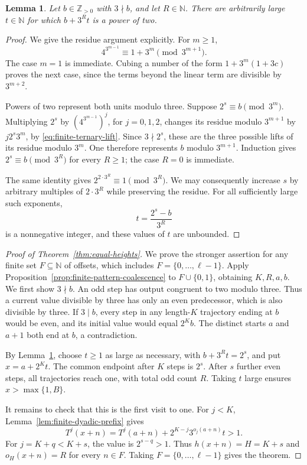 \documentclass[11pt,a4paper]{article}
\newtheorem{lemma}[theorem]{Lemma}
\begin{document}
\begin{lemma}\label{lem:finite-power-two-residue}
Let $b\in\mathbb Z_{>0}$ with $3\nmid b$, and let $R\in\mathbb N$.
There are arbitrarily large $t\in\mathbb N$ for which
$b+3^Rt$ is a power of two.
\end{lemma}
\begin{proof}
We give the residue argument explicitly. For $m\ge1$,
\begin{equation}\label{eq:finite-ternary-lift}
4^{3^{m-1}}\equiv1+3^m\pmod{3^{m+1}}.
\end{equation}
The case $m=1$ is immediate. Cubing a number of the form
$1+3^m(1+3c)$ proves the next case, since the terms beyond the
linear term are divisible by $3^{m+2}$.

Powers of two represent both units modulo three. Suppose
$2^s\equiv b\pmod{3^m}$. Multiplying $2^s$ by
$(4^{3^{m-1}})^j$, for $j=0,1,2$, changes its residue modulo
$3^{m+1}$ by $j2^s3^m$, by \eqref{eq:finite-ternary-lift}.
Since $3\nmid2^s$, these are the three possible lifts of its
residue modulo $3^m$. One therefore represents $b$ modulo
$3^{m+1}$. Induction gives $2^s\equiv b\pmod{3^R}$
for every $R\ge1$; the case $R=0$ is immediate.

The same identity gives
$2^{2\cdot3^R}\equiv1\pmod{3^R}$.
We may consequently increase $s$ by arbitrary multiples of
$2\cdot3^R$ while preserving the residue. For all sufficiently
large such exponents,
\[
t=\frac{2^s-b}{3^R}
\]
is a nonnegative integer, and these values of $t$ are unbounded.
\end{proof}

\begin{proof}[Proof of Theorem~\ref{thm:equal-heights}]
We prove the stronger assertion for any finite set $F\subseteq\mathbb N$
of offsets, which includes $F=\{0,\ldots,\ell-1\}$.
Apply Proposition~\ref{prop:finite-pattern-coalescence} to
$F\cup\{0,1\}$, obtaining $K,R,a,b$.
We first show $3\nmid b$. An odd step has output congruent
to two modulo three. Thus a current value divisible by three has
only an even predecessor, which is also divisible by three.
If $3\mid b$, every step in any length-$K$ trajectory ending
at $b$ would be even, and its initial value would equal $2^Kb$.
The distinct starts $a$ and $a+1$ both end at $b$, a
contradiction.

By Lemma~\ref{lem:finite-power-two-residue}, choose $t\ge1$
as large as necessary, with $b+3^Rt=2^s$, and put
$x=a+2^Kt$. The common endpoint after $K$ steps is $2^s$.
After $s$ further even steps, all trajectories reach one, with
total odd count $R$. Taking $t$ large ensures
$x>\max\{1,B\}$.

It remains to check that this is the first visit to one.
For $j<K$, Lemma~\ref{lem:finite-dyadic-prefix} gives
\[
T^j(x+n)=T^j(a+n)+2^{K-j}3^{o_j(a+n)}t>1.
\]
For $j=K+q<K+s$, the value is $2^{s-q}>1$.
Thus $h(x+n)=H=K+s$ and $o_H(x+n)=R$ for every $n\in F$.
Taking $F=\{0,\ldots,\ell-1\}$ gives the theorem.
\end{proof}
\end{document}
